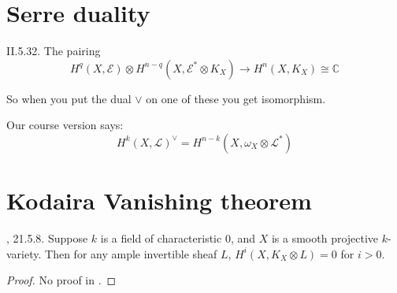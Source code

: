 \section{Serre duality}
\label{section-serre-duality}

\begin{theorem} \label{theorem-serre-duality} \cite{voi}
II.5.32. The pairing
$$
H^q(X,\mathcal{E})\otimes
H^{n-q}(X,\mathcal{E}^*\otimes K_X)\to H^{n}(X,K_X)\cong\mathbb{C}
$$

\end{theorem}

So when you put the dual \(\vee\) on one of these you get isomorphism.

Our course version says:
$$
H^{k}(X,\mathcal{L})^{\vee}=H^{n-k}(X,\omega_X \otimes \mathcal{L}^*)
$$
\section{Kodaira Vanishing theorem}
\label{section-Kodaira-vanishing-theorem}

\begin{theorem}[Kodaira]
\label{theorem-Kodaira-vanishing}
\cite{sea}, 21.5.8. Suppose $k$ is a field of characteristic 0, and $X$ is a
smooth projective $k$-variety. Then for any ample invertible sheaf $L$,
$H^{i}(X,K_X \otimes L)=0$ for $i>0$.
\end{theorem}

\begin{proof}
No proof in \cite{sea}.
\end{proof}







